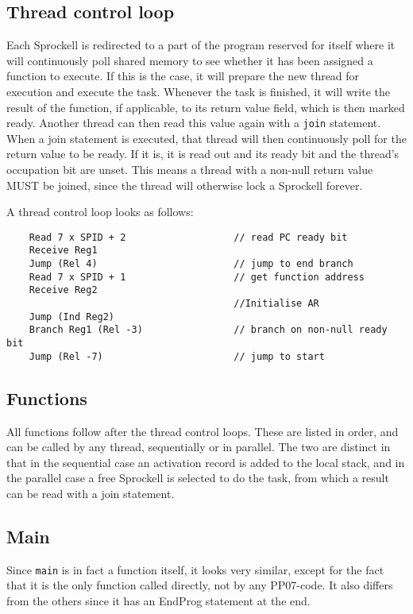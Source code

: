 \documentclass[10pt,a4paper]{report}
\begin{document}
\subsection{Thread control loop}
Each Sprockell is redirected to a part of the program reserved for itself where it will continuously poll shared memory to see whether it has been assigned a function to execute. If this is the case, it will prepare the new thread for execution and execute the task. Whenever the task is finished, it will write the result of the function, if applicable, to its return value field, which is then marked ready. Another thread can then read this value again with a \texttt{join} statement. When a join statement is executed, that thread will then continuously poll for the return value to be ready. If it is, it is read out and its ready bit and the thread's occupation bit are unset. This means a thread with a non-null return value MUST be joined, since the thread will otherwise lock a Sprockell forever. 

A thread control loop looks as follows:
\begin{lstlisting}
	Read 7 x SPID + 2					// read PC ready bit
	Receive Reg1
	Jump (Rel 4)						// jump to end branch
	Read 7 x SPID + 1					// get function address
	Receive Reg2
										//Initialise AR
	Jump (Ind Reg2)
	Branch Reg1 (Rel -3)				// branch on non-null ready bit
	Jump (Rel -7)						// jump to start
\end{lstlisting}


\subsection{Functions}
All functions follow after the thread control loops. These are listed in order, and can be called by any thread, sequentially or in parallel. The two are distinct in that in the sequential case an activation record is added to the local stack, and in the parallel case a free Sprockell is selected to do the task, from which a result can be read with a join statement.

\subsection{Main}


Since \texttt{main} is in fact a function itself, it looks very similar, except for the fact that it is the only function called directly, not by any PP07-code. It also differs from the others since it has an EndProg statement at the end.
\end{document}
